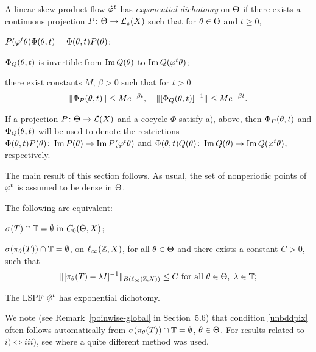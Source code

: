 \begin{defn}
A linear skew product flow ${\hat{\varphi}}^t$ has {\em exponential
dichotomy} on $\Theta$ if there exists a continuous projection
$P\colon \Theta\to {\cal{L}}_s(X)$ such that for $\theta\in\Theta$ and $t\ge0$,
\begin{list}{)}{}
\item  $P(\varphi^t\theta)\Phi(\theta,t) =\Phi(\theta,t)P(\theta)$;
\item  $\Phi_Q(\theta,t)$ is invertible from $\operatorname{Im} Q(\theta)$ to
$\operatorname{Im} Q(\varphi^t\theta)$;
\item there exist constants $M$, $\beta >0$ such that for $t>0$
$$
\|\Phi_P(\theta,t)\| \leq Me^{-\beta t},\quad
\|[\Phi_Q(\theta,t)]^{-1}\| \leq Me^{-\beta t}.
$$
\end{list}
\end{defn}

If a projection $P\colon \Theta\to {\cal{L}}(X)$ and a cocycle $\Phi$
satisfy a), above, then $\Phi_P(\theta,t)$ and $\Phi_Q(\theta,t)$
will be used to denote the restrictions
$\Phi(\theta,t)P(\theta)\colon \operatorname{Im} P(\theta)\to\operatorname{Im} P(\varphi^t\theta)$ and
$\Phi(\theta,t)Q(\theta)\colon \operatorname{Im} Q(\theta)\to\operatorname{Im} Q(\varphi^t\theta)$, respectively.

The main result of this section follows.  As usual, the set of
nonperiodic points of $\varphi^t$ is assumed to be dense in $\Theta$.


\begin{thm}
The following are equivalent:
\begin{list}{)}{}
\item $\sigma (T) \cap {\Bbb{T}} = \emptyset \text{ in  } C_0(\Theta,X)$;
\item $\sigma(\pi_\theta(T))\cap {\Bbb{T}} = \emptyset$, on $\ell_\infty({\Bbb{Z}},X)$,  for all
$\theta\in \Theta$ and there exists a  constant $C>0$,  such that
\begin{equation}\label{unbddpix}
   \|[\pi_\theta(T)-\lambda I]^{-1}\|_{B(\ell_\infty({\Bbb{Z}},X))}\le C
   \text{ for all } \theta\in \Theta, \; \lambda \in {\Bbb{T}};\end{equation}
\item The LSPF ${\hat{\varphi}}^t$ has exponential dichotomy.
\end{list}
\end{thm}

We note (see Remark~\ref{poinwise-global} in Section~5.6) that
condition \eqref{unbddpix} often follows automatically  from
$\sigma(\pi_\theta(T))\cap {\Bbb{T}} = \emptyset$, $\theta\in \Theta$. For
results related to $i)\Leftrightarrow iii)$, see
\cite{Rab,Rau,Rau1,Rau2} where a quite different method was used.

